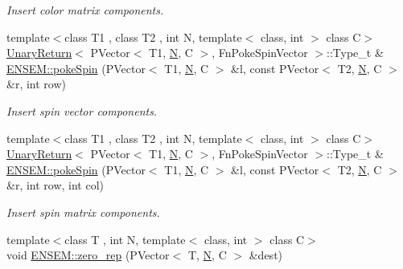 \begin{DoxyCompactItemize}
\begin{DoxyCompactList}\small\item\em Insert color matrix components. \end{DoxyCompactList}\item 
{\footnotesize template$<$class T1 , class T2 , int N, template$<$ class, int $>$ class C$>$ }\\\mbox{\hyperlink{structUnaryReturn}{Unary\+Return}}$<$ P\+Vector$<$ T1, \mbox{\hyperlink{adat__devel_2lib_2hadron_2operator__name__util_8cc_a7722c8ecbb62d99aee7ce68b1752f337}{N}}, C $>$, Fn\+Poke\+Spin\+Vector $>$\+::Type\+\_\+t \& \mbox{\hyperlink{group__primvector_ga10934b73afbfb3796cad8a1208d7ab1d}{E\+N\+S\+E\+M\+::poke\+Spin}} (P\+Vector$<$ T1, \mbox{\hyperlink{adat__devel_2lib_2hadron_2operator__name__util_8cc_a7722c8ecbb62d99aee7ce68b1752f337}{N}}, C $>$ \&l, const P\+Vector$<$ T2, \mbox{\hyperlink{adat__devel_2lib_2hadron_2operator__name__util_8cc_a7722c8ecbb62d99aee7ce68b1752f337}{N}}, C $>$ \&r, int row)
\begin{DoxyCompactList}\small\item\em Insert spin vector components. \end{DoxyCompactList}\item 
{\footnotesize template$<$class T1 , class T2 , int N, template$<$ class, int $>$ class C$>$ }\\\mbox{\hyperlink{structUnaryReturn}{Unary\+Return}}$<$ P\+Vector$<$ T1, \mbox{\hyperlink{adat__devel_2lib_2hadron_2operator__name__util_8cc_a7722c8ecbb62d99aee7ce68b1752f337}{N}}, C $>$, Fn\+Poke\+Spin\+Vector $>$\+::Type\+\_\+t \& \mbox{\hyperlink{group__primvector_ga89df0ab0f1f2a2f4374c848c2180493f}{E\+N\+S\+E\+M\+::poke\+Spin}} (P\+Vector$<$ T1, \mbox{\hyperlink{adat__devel_2lib_2hadron_2operator__name__util_8cc_a7722c8ecbb62d99aee7ce68b1752f337}{N}}, C $>$ \&l, const P\+Vector$<$ T2, \mbox{\hyperlink{adat__devel_2lib_2hadron_2operator__name__util_8cc_a7722c8ecbb62d99aee7ce68b1752f337}{N}}, C $>$ \&r, int row, int col)
\begin{DoxyCompactList}\small\item\em Insert spin matrix components. \end{DoxyCompactList}\item 
{\footnotesize template$<$class T , int N, template$<$ class, int $>$ class C$>$ }\\void \mbox{\hyperlink{group__primvector_gac04295d27d75b37281c54b208d478624}{E\+N\+S\+E\+M\+::zero\+\_\+rep}} (P\+Vector$<$ T, \mbox{\hyperlink{adat__devel_2lib_2hadron_2operator__name__util_8cc_a7722c8ecbb62d99aee7ce68b1752f337}{N}}, C $>$ \&dest)

\end{DoxyCompactItemize}
